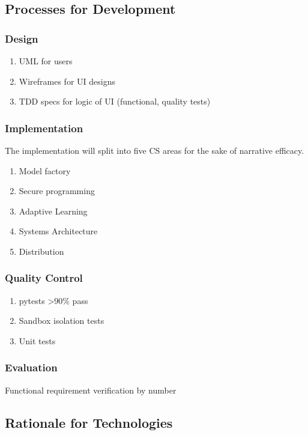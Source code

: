 \documentclass{article}
\begin{document}
\subsection{Processes for Development}

\subsubsection{Design}
\begin{enumerate}
    \item UML for users
    \item Wireframes for UI designs
    \item TDD specs for logic of UI (functional, quality tests)
\end{enumerate}

\subsubsection{Implementation}
The implementation will split into five CS areas for the sake of narrative efficacy.
\begin{enumerate}
    \item Model factory
    \item Secure programming
    \item Adaptive Learning
    \item Systems Architecture
    \item Distribution
\end{enumerate}

\subsubsection{Quality Control}
\begin{enumerate}
    \item pytests >90\% pass
    \item Sandbox isolation tests
    \item Unit tests
\end{enumerate}

\subsubsection{Evaluation}
Functional requirement verification by number

\subsection{Rationale for Technologies}
\end{document}

